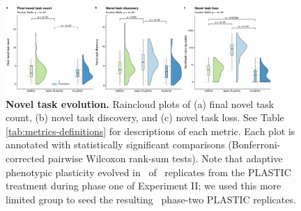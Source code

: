 \begin{figure}[h!]
    \centering
    \includegraphics[width=0.9\textwidth]{media/complex-traits-magnitude-panel.pdf}
    \caption{\small
    \textbf{Novel task evolution.}
    Raincloud plots of 
    (a) final novel task count,
    (b) novel task discovery,
    and (c) novel task loss.
    See Table \ref{tab:metrics-definitions} for descriptions of each metric.
    Each plot is annotated with statistically significant comparisons (Bonferroni-corrected pairwise Wilcoxon rank-sum tests).
    Note that adaptive phenotypic plasticity evolved in \novelTraitsPlasticReps\ of \novelTraitsReplicates\ replicates from the PLASTIC treatment during phase one of Experiment II; we used this more limited group to seed the resulting \novelTraitsPlasticReps\ phase-two PLASTIC replicates.
    }
    \label{fig:complex-traits-magnitude}
\end{figure}